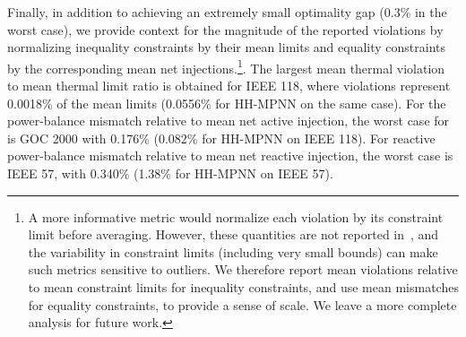 Finally, in addition to achieving an extremely small optimality gap (0.3\% in the worst case), we provide context for the magnitude of the reported violations by normalizing inequality constraints by their mean limits and equality constraints by the corresponding mean net injections.\footnote{A more informative metric would normalize each violation by its constraint limit before averaging. However, these quantities are not reported in~\cite{arowolo2025}, and the variability in constraint limits (including very small bounds) can make such metrics sensitive to outliers. We therefore report mean violations relative to mean constraint limits for inequality constraints, and use mean mismatches for equality constraints, to provide a sense of scale. We leave a more complete analysis for future work.}. The largest mean thermal violation to mean thermal limit ratio is obtained for IEEE 118, where violations represent 0.0018\% of the mean limits (0.0556\% for HH-MPNN on the same case). For the power-balance mismatch relative to mean net active injection, the worst case for \genco is GOC 2000 with 0.176\% (0.082\% for HH-MPNN on IEEE 118). For reactive power-balance mismatch relative to mean net reactive injection, the worst case is IEEE 57, with 0.340\% (1.38\% for HH-MPNN on IEEE 57).\\







